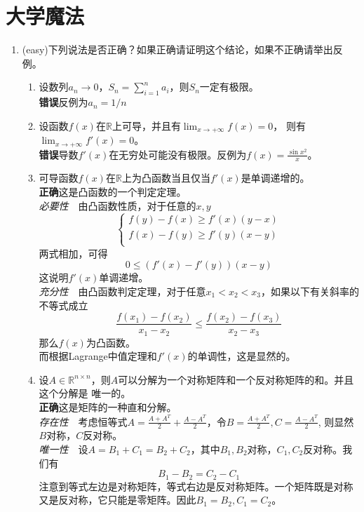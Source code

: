 \documentclass[a4paper]{article}
\begin{document}
\section{大学魔法}
\begin{enumerate}
\item (easy)下列说法是否正确？如果正确请证明这个结论，如果不正确请举出反例。
	\begin{enumerate}
	\item 设数列$a_n\rightarrow 0$，$S_n=\sum_{i=1}^{n}a_i$，则$S_n$一定有极限。\\
	\textbf{错误}\quad 反例为$a_n=1/n$
	\item 设函数$f(x)$在$\mathbb{R}$上可导，并且有$\lim_{x\rightarrow +\infty}f(x)=0$，
	则有$\lim_{x\rightarrow +\infty}f'(x)=0$。\\
	\textbf{错误}\quad 导数$f'(x)$在无穷处可能没有极限。反例为$f(x)=\frac{\sin x^2}{x}$。
	\item 可导函数$f(x)$在$\mathbb{R}$上为凸函数当且仅当$f'(x)$是单调递增的。\\
	\textbf{正确}\quad 这是凸函数的一个判定定理。\\
	\emph{必要性}~~由凸函数性质，对于任意的$x,y$
	\[
	\left\{\begin{array}{l}
	f(y)-f(x)\geq f'(x)(y-x)\\
	f(x)-f(y)\geq f'(y)(x-y)\\
	\end{array}
	\right.
	\]
	两式相加，可得
	\[
	0\leq (f'(x)-f'(y))(x-y)
	\]
	这说明$f'(x)$单调递增。\\
	\emph{充分性}~~由凸函数判定定理，对于任意$x_1<x_2<x_3$，如果以下有关斜率的不等式成立
	\[
	\frac{f(x_1)-f(x_2)}{x_1-x_2}\leq \frac{f(x_2)-f(x_3)}{x_2-x_3}
	\]
	那么$f(x)$为凸函数。\\
	而根据Lagrange中值定理和$f'(x)$的单调性，这是显然的。
	\item 设$A\in \mathbb{R}^{n\times n}$，则$A$可以分解为一个对称矩阵和一个反对称矩阵的和。并且这个分解是
	唯一的。\\
	\textbf{正确}\quad 这是矩阵的一种直和分解。\\
	\emph{存在性}~~考虑恒等式$A=\frac{A+A^T}{2}+\frac{A-A^T}{2}$，令$B=\frac{A+A^T}{2},C=\frac{A-A^T}{2}$,
	则显然$B$对称，$C$反对称。\\
	\emph{唯一性}~~设$A=B_1+C_1=B_2+C_2$，其中$B_1,B_2$对称，$C_1,C_2$反对称。我们有
	\[
	B_1-B_2=C_2-C_1
	\]
	注意到等式左边是对称矩阵，等式右边是反对称矩阵。一个矩阵既是对称又是反对称，它只能是零矩阵。因此$B_1=B_2,C_1=C_2$。
	\end{enumerate}

\end{enumerate}
\end{document}
